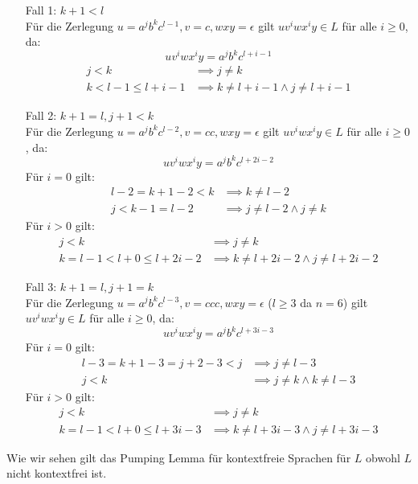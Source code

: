 \documentclass[]{article}
\begin{document}
\begin{itemize}
\item[Fall 1:]$k+1< l$\\
F\"ur die Zerlegung $u=a^jb^kc^{l-1},v=c,wxy=\epsilon$ gilt $uv^iwx^iy\in L$ f\"ur alle $i\geq0$, da:
$$uv^iwx^iy=a^jb^kc^{l+i-1}$$
\begin{align*}
j<k &\implies j \neq k\\
k<l-1\leq l+i-1 &\implies k\neq l+i-1 \wedge j\neq l+i-1
\end{align*}
\item[Fall 2:]$k+1=l,j+1<k$\\
F\"ur die Zerlegung $u=a^jb^kc^{l-2},v=cc,wxy=\epsilon$ gilt $uv^iwx^iy\in L$ f\"ur alle $i\geq0$, da:
$$uv^iwx^iy=a^jb^kc^{l+2i-2}$$
F\"ur $i=0$ gilt:
\begin{align*}
l-2=k+1-2<k &\implies k\neq l-2\\
j<k-1=l-2 &\implies j\neq l-2 \wedge j\neq k
\end{align*}
F\"ur $i>0$ gilt:
\begin{align*}
j<k &\implies j \neq k\\
k=l-1<l+0\leq l+2i-2 &\implies k\neq l+2i-2 \wedge j\neq l+2i-2
\end{align*}
\item[Fall 3:]$k+1=l, j+1=k$\\
F\"ur die Zerlegung $u=a^jb^kc^{l-3},v=ccc,wxy=\epsilon$ ($l\geq3$ da $n=6$) gilt $uv^iwx^iy\in L$ f\"ur alle $i\geq0$, da:
$$uv^iwx^iy=a^jb^kc^{l+3i-3}$$
F\"ur $i=0$ gilt:
\begin{align*}
l-3=k+1-3=j+2-3<j &\implies j\neq l-3\\
j<k &\implies j\neq k \wedge k\neq l-3
\end{align*}
F\"ur $i>0$ gilt:
\begin{align*}
j<k &\implies j \neq k\\
k=l-1<l+0\leq l+3i-3 &\implies k\neq l+3i-3 \wedge j\neq l+3i-3
\end{align*}
\end{itemize}
Wie wir sehen gilt das Pumping Lemma f\"ur kontextfreie Sprachen f\"ur $L$ obwohl $L$ nicht kontextfrei ist.
\end{document}
